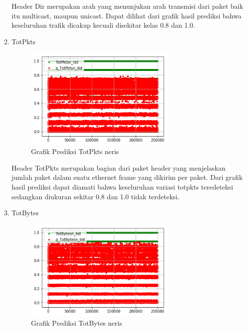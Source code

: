 \documentclass[./skripsi.tex]{subfiles}
\begin{document}
\begin{enumerate}
    \par Header Dir merupakan arah yang menunjukan arah transmisi dari paket baik itu multicast, maupun unicast. Dapat dilihat dari grafik hasil prediksi bahwa keseluruhan trafik dicakup kecuali disekitar kelas 0.8 dan 1.0.
    
    \item TotPkts
    \begin{figure}%
        \centering
        \includegraphics[width=0.7\textwidth]{public/assets/img/lstmm_neris_pred7.png}
        \caption{Grafik Prediksi TotPkts neris}
        \label{fig:lstmm_neris_pred7}
    \end{figure}
    
    \par Header TotPkts merupakan bagian dari paket header yang menjelaskan jumlah paket dalam suatu ethernet frame yang dikirim per paket. Dari grafik hasil prediksi dapat diamati bahwa keseluruhan variasi totpkts teredeteksi sedangkan diukuran sekitar 0.8 dan 1.0 tidak terdeteksi.
    
    \item TotBytes
    \begin{figure}%
        \centering
        \includegraphics[width=0.7\textwidth]{public/assets/img/lstmm_neris_pred8.png}
        \caption{Grafik Prediksi TotBytes neris}
        \label{fig:lstmm_neris_pred8}
    \end{figure}
    

\end{enumerate}
\end{document}
